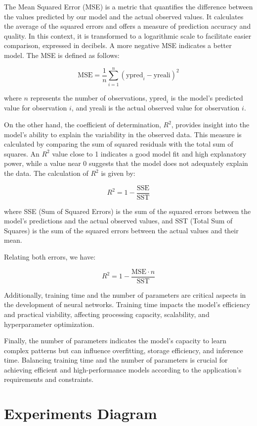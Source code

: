 The Mean Squared Error (MSE) is a metric that quantifies the difference between the values predicted by our model and the actual observed values. It calculates the average of the squared errors and offers a measure of prediction accuracy and quality. In this context, it is transformed to a logarithmic scale to facilitate easier comparison, expressed in decibels. A more negative MSE indicates a better model. The MSE is defined as follows:

\[
\text{MSE} = \frac{1}{n} \sum_{i=1}^{n} (\text{ypred}_i - \text{yreali})^2
\]

where \( n \) represents the number of observations, \( \text{ypred}_i \) is the model's predicted value for observation \( i \), and \( \text{yreali} \) is the actual observed value for observation \( i \).

On the other hand, the coefficient of determination, \( R^2 \), provides insight into the model's ability to explain the variability in the observed data. This measure is calculated by comparing the sum of squared residuals with the total sum of squares. An \( R^2 \) value close to 1 indicates a good model fit and high explanatory power, while a value near 0 suggests that the model does not adequately explain the data. The calculation of \( R^2 \) is given by:

\[
R^2 = 1 - \frac{\text{SSE}}{\text{SST}}
\]

where SSE (Sum of Squared Errors) is the sum of the squared errors between the model's predictions and the actual observed values, and SST (Total Sum of Squares) is the sum of the squared errors between the actual values and their mean.

Relating both errors, we have:

\[
R^2 = 1 - \frac{\text{MSE} \cdot n}{\text{SST}}
\]

Additionally, training time and the number of parameters are critical aspects in the development of neural networks. Training time impacts the model's efficiency and practical viability, affecting processing capacity, scalability, and hyperparameter optimization.

Finally, the number of parameters indicates the model's capacity to learn complex patterns but can influence overfitting, storage efficiency, and inference time. Balancing training time and the number of parameters is crucial for achieving efficient and high-performance models according to the application’s requirements and constraints.

\section{Experiments Diagram}

